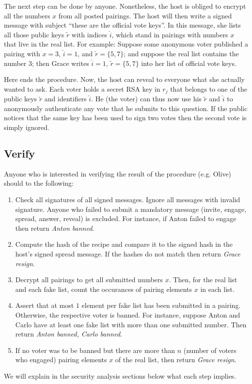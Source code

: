 \documentclass{article}
\theoremstyle{definition}
\begin{document}
	The next step can be done by anyone. Nonetheless, the host is obliged to encrypt all the numbers $x$ from all posted pairings. The host will then write a signed message with subject ``these are the official vote keys''. In this message, she lists all those public keys $\tilde{r}$ with indices $\hat{i}$, which stand in pairings with numbers $x$ that live in the real list. For example: Suppose some anonymous voter published a pairing with $x=3$, $\hat{i}=1$, and $\tilde{r}=\lbrace5,7\rbrace$; and suppose the real list contains the number $3$; then Grace writes $\hat{i}=1$, $\tilde{r}=\lbrace5,7\rbrace$ into her list of official vote keys.
	
	\vspace{10mm}
	
	Here ends the procedure. Now, the host can reveal to everyone what she actually wanted to ask. Each voter holds a secret RSA key in $r_j$ that belongs to one of the public keys $\tilde{r}$ and identifiers $\hat{i}$. He (the voter) can thus now use his $\tilde{r}$ and $\hat{i}$ to anonymously authenticate any vote that he submits to this question. If the public notices that the same key has been used to sign two votes then the second vote is simply ignored.
	
	\subsection{Verify}
	Anyone who is interested in verifying the result of the procedure (e.g. Olive) should to the following:
	\begin{enumerate}
		\item Check all signatures of all signed messages. Ignore all messages with invalid signature. Anyone who failed to submit a mandatory message (invite, engage, spread, answer, reveal) is excluded. For instance, if Anton failed to engage then return \textsl{Anton banned}.
		\item Compute the hash of the recipe and compare it to the signed hash in the host's signed spread message. If the hashes do not match then return \textsl{Grace resign}.
		\item Decrypt all pairings to get all submitted numbers $x$. Then, for the real list and each fake list,  count the occurances of pairing elements $x$ in each list.
		\item Assert that at most $1$ element per fake list has been submitted in a pairing. Otherwise, the respective voter is banned. For instance, suppose Anton and Carlo have at least one fake list with more than one submitted number. Then return \textsl{Anton banned, Carlo banned}.
		\item If no voter was to be banned but there are more than $n$ (number of voters who engaged) pairing elements $x$ of the real list, then return \textsl{Grace resign}.
	\end{enumerate}
	We will explain in the security analysis sections below what each step implies.
	
\end{document}
